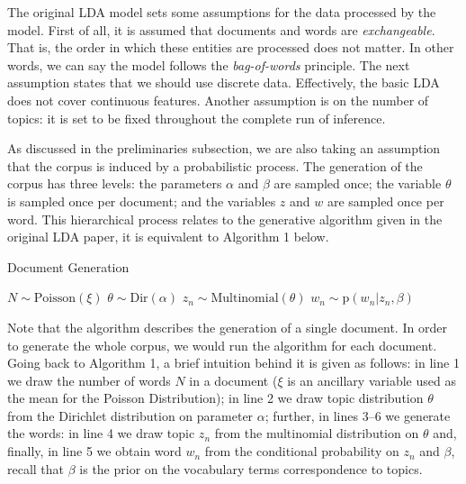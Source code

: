\documentclass{mprop}
\begin{document}
\par The original LDA model sets some assumptions for the data processed by the model. First of all, it is assumed that documents and words are \textit{exchangeable}. That is, the order in which these entities are processed does not matter. In other words, we can say the model follows the \textit{bag-of-words} principle. The next assumption states that we should use discrete data. Effectively, the basic LDA does not cover  continuous features. Another assumption is on the number of topics: it is set to be fixed throughout the complete run of inference.  

\par As discussed in the preliminaries subsection, we are also taking an assumption that the corpus is induced by a probabilistic process. The generation of the corpus has three levels: the parameters $\alpha$ and $\beta$ are sampled once; the variable $\theta$ is sampled once per document; and the variables $z$ and $w$ are sampled once per word. This hierarchical process relates to the generative algorithm given in the original LDA paper, it is equivalent to Algorithm 1 below.
\begin{algorithm}[H]
\caption{Document Generation}
\label{alg:document_generation}
\begin{algorithmic}[1]
\State $N \sim \mbox{Poisson}(\xi)$
\State $\theta \sim \mbox{Dir}(\alpha)$
\State $z_n \sim \mbox{Multinomial}(\theta)$
\State $w_n \sim \mbox{p}(w_n | z_n, \beta)$
\EndFor
\end{algorithmic}
\end{algorithm}
Note that the algorithm describes the generation of a single document. In order to generate the whole corpus, we would run the algorithm for each document. Going back to Algorithm 1, a brief intuition behind it is given as follows: in line 1 we draw the number of words $N$ in a document ($\xi$ is an ancillary variable used as the mean for the Poisson Distribution); in line 2 we draw topic distribution $\theta$ from the Dirichlet distribution on parameter $\alpha$; further, in lines 3--6 we generate the words: in line 4 we draw topic $z_n$ from the multinomial distribution on $\theta$ and, finally, in line 5 we obtain  word $w_n$ from the conditional probability on $z_n$ and $\beta$, recall that $\beta$ is the prior on the vocabulary terms correspondence to topics.
\end{document}
